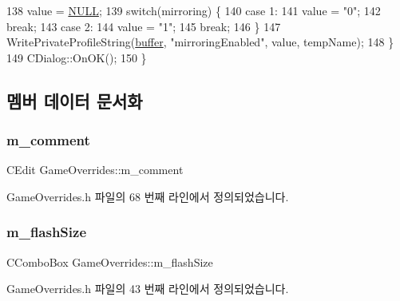 \begin{DoxyCode}
138     value = \mbox{\hyperlink{getopt1_8c_a070d2ce7b6bb7e5c05602aa8c308d0c4}{NULL}};
139     \textcolor{keywordflow}{switch}(mirroring) \{
140     \textcolor{keywordflow}{case} 1:
141       value = \textcolor{stringliteral}{"0"};
142       \textcolor{keywordflow}{break};
143     \textcolor{keywordflow}{case} 2:
144       value = \textcolor{stringliteral}{"1"};
145       \textcolor{keywordflow}{break};
146     \}
147     WritePrivateProfileString(\mbox{\hyperlink{_g_b_a_8cpp_a28d4d3d8445e73a696b2d6f7eadabd96}{buffer}}, \textcolor{stringliteral}{"mirroringEnabled"}, value, tempName);
148   \}
149   CDialog::OnOK();
150 \}
\end{DoxyCode}


\subsection{멤버 데이터 문서화}
\mbox{\label{class_game_overrides_a8fda5a63d4695c79b4bb430717a01daa}} 
\subsubsection{\texorpdfstring{m\+\_\+comment}{m\_comment}}
{\footnotesize\ttfamily C\+Edit Game\+Overrides\+::m\+\_\+comment}



Game\+Overrides.\+h 파일의 68 번째 라인에서 정의되었습니다.

\mbox{\label{class_game_overrides_a3f75d6a84d709bc9052eae826ae4b1c3}} 
\subsubsection{\texorpdfstring{m\+\_\+flash\+Size}{m\_flashSize}}
{\footnotesize\ttfamily C\+Combo\+Box Game\+Overrides\+::m\+\_\+flash\+Size}



Game\+Overrides.\+h 파일의 43 번째 라인에서 정의되었습니다.

\mbox{\label{class_game_overrides_a3aeea798546add267de2b8a59b4d6e0e}} 
